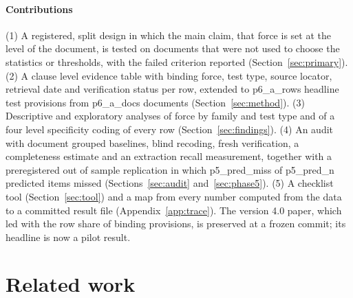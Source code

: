 \documentclass[conference]{IEEEtran}
\begin{document}
\paragraph{Contributions} (1) A registered, split design in which the main claim, that force is set at the level of the document, is tested on documents that were not used to choose the statistics or thresholds, with the failed criterion reported (Section~\ref{sec:primary}). (2) A clause level evidence table with binding force, test type, source locator, retrieval date and verification status per row, extended to {{p6_a_rows}} headline test provisions from {{p6_a_docs}} documents (Section~\ref{sec:method}). (3) Descriptive and exploratory analyses of force by family and test type and of a four level specificity coding of every row (Section~\ref{sec:findings}). (4) An audit with document grouped baselines, blind recoding, fresh verification, a completeness estimate and an extraction recall measurement, together with a preregistered out of sample replication in which {{p5_pred_miss}} of {{p5_pred_n}} predicted items missed (Sections~\ref{sec:audit} and~\ref{sec:phase5}). (5) A checklist tool (Section~\ref{sec:tool}) and a map from every number computed from the data to a committed result file (Appendix~\ref{app:trace}). The version 4.0 paper, which led with the row share of binding provisions, is preserved at a frozen commit; its headline is now a pilot result.

\section{Related work}
\end{document}
